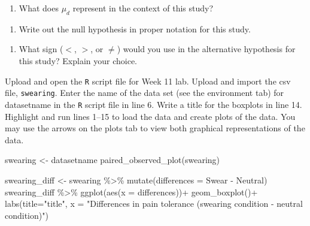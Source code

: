 \documentclass[
]{report}
\newenvironment{Shaded}{\begin{snugshade}}{\end{snugshade}}
\newcommand{\AttributeTok}[1]{\textcolor[rgb]{0.77,0.63,0.00}{#1}}
\newcommand{\FunctionTok}[1]{\textcolor[rgb]{0.00,0.00,0.00}{#1}}
\newcommand{\NormalTok}[1]{#1}
\newcommand{\OtherTok}[1]{\textcolor[rgb]{0.56,0.35,0.01}{#1}}
\newcommand{\SpecialCharTok}[1]{\textcolor[rgb]{0.00,0.00,0.00}{#1}}
\newcommand{\StringTok}[1]{\textcolor[rgb]{0.31,0.60,0.02}{#1}}
\providecommand{\tightlist}{%
  \setlength{\itemsep}{0pt}\setlength{\parskip}{0pt}}
\begin{document}
\begin{enumerate}
\def\labelenumi{\arabic{enumi}.}
\setcounter{enumi}{3}
\tightlist
\item
  What does \(\mu_d\) represent in the context of this study?
\end{enumerate}

\vspace{0.8in}

\begin{enumerate}
\def\labelenumi{\arabic{enumi}.}
\setcounter{enumi}{4}
\tightlist
\item
  Write out the null hypothesis in proper notation for this study.
\end{enumerate}

\vspace{0.8in}

\begin{enumerate}
\def\labelenumi{\arabic{enumi}.}
\setcounter{enumi}{5}
\tightlist
\item
  What sign (\(<\), \(>\), or \(\neq\)) would you use in the alternative hypothesis for this study? Explain your choice.
\end{enumerate}

\vspace{0.5in}

Upload and open the \texttt{R} script file for Week 11 lab. Upload and import the csv file, \texttt{swearing}. Enter the name of the data set (see the environment tab) for datasetname in the \texttt{R} script file in line 6. Write a title for the boxplots in line 14. Highlight and run lines 1--15 to load the data and create plots of the data. You may use the arrows on the plots tab to view both graphical representations of the data.

\begin{Shaded}
\begin{Highlighting}[]
\NormalTok{swearing }\OtherTok{\textless{}{-}}\NormalTok{ datasetname}
\FunctionTok{paired\_observed\_plot}\NormalTok{(swearing)}

\NormalTok{swearing\_diff }\OtherTok{\textless{}{-}}\NormalTok{ swearing }\SpecialCharTok{\%\textgreater{}\%} 
  \FunctionTok{mutate}\NormalTok{(}\AttributeTok{differences =}\NormalTok{ Swear }\SpecialCharTok{{-}}\NormalTok{ Neutral)}
\NormalTok{swearing\_diff }\SpecialCharTok{\%\textgreater{}\%}
  \FunctionTok{ggplot}\NormalTok{(}\FunctionTok{aes}\NormalTok{(}\AttributeTok{x =}\NormalTok{ differences))}\SpecialCharTok{+}
  \FunctionTok{geom\_boxplot}\NormalTok{()}\SpecialCharTok{+}
  \FunctionTok{labs}\NormalTok{(}\AttributeTok{title=}\StringTok{"title"}\NormalTok{,}
       \AttributeTok{x =} \StringTok{"Differences in pain tolerance (swearing condition {-} neutral condition)"}\NormalTok{)}
\end{Highlighting}
\end{Shaded}
\end{document}
